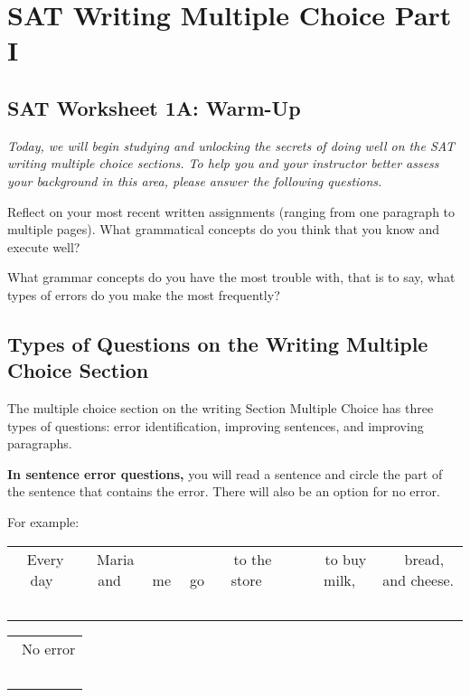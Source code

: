 \chapter[Multiple Choice Part I]{SAT Writing Multiple Choice Part I}

\section{SAT Worksheet 1A: Warm-Up}
\textit{Today, we will begin studying and unlocking the secrets of doing well on the SAT writing multiple choice sections. To help you and your instructor better assess your background in this area, please answer the following questions.}

\bigskip
Reflect on your most recent written assignments (ranging from one paragraph to multiple pages). What grammatical concepts do you think that you know and execute well?




\vfill

What grammar concepts do you have the most trouble with, that is to say, what types of errors do you make the most frequently? 

\vfill
\pagebreak
\section[Types of Questions]{Types of Questions on the Writing Multiple Choice Section}

The multiple choice section on the writing Section Multiple Choice has three types of questions: error identification, improving sentences, and improving paragraphs.

\bigskip
\textbf{In sentence error questions,} you will read a sentence and circle the part of the sentence that contains the error. There will also be an option for no error. 

\bigskip
For example:

\begin{inparaenum}[A]
\begin{spacing}{1.25}
\begin{tabularx}{\textwidth}{*8{@{}>{\ }c}}
Every day & Maria and & me & go & to the store & \ & to buy milk, & bread, and cheese.  \\
\item &  &\item & & \item & &\item &  \\
\end{tabularx}

\begin{tabularx}{\textwidth}{*1{@{}>{\ }c}}
No error
\\
\item\\
\end{tabularx}

\end{spacing}

\end{inparaenum}

